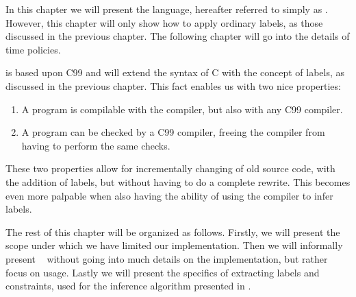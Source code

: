 
In this chapter we will present the \thelanglong{} language, hereafter referred to simply as \thelang.
However, this chapter will only show how to apply ordinary labels, as those discussed in the previous chapter.
The following chapter will go into the details of time policies.

\thelang{} is based upon C99 and will extend the syntax of C with the concept of labels, as discussed in the previous chapter.
This fact enables us with two nice properties:
\begin{enumerate}
  \item A \thelang{} program is compilable with the \thelang{} compiler, but also with any C99 compiler.
  \item A \thelang{} program can be checked by a C99 compiler, freeing the \thelang{} compiler from having to perform the same checks.
\end{enumerate}
These two properties allow for incrementally changing of old source code, with the addition of labels, but without having to do a complete rewrite.
This becomes even more palpable when also having the ability of using the \thelang{} compiler to infer labels.

The rest of this chapter will be organized as follows.
Firstly, we will present the scope under which we have limited our implementation.
Then we will informally present \thelang~ without going into much details on the implementation, but rather focus on usage.
Lastly we will present the specifics of extracting labels and constraints, used for the inference algorithm presented in .
